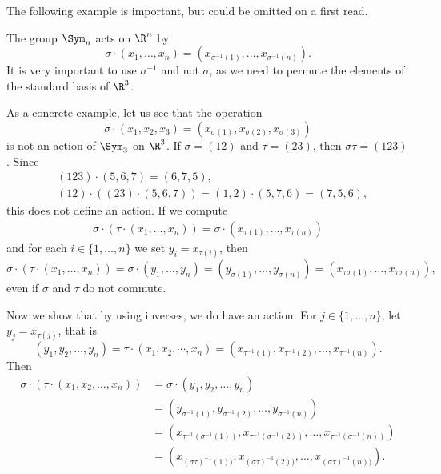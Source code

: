 The following example is important, but could be omitted on a first read.

\begin{optional}  
\begin{example}
    The group $\Sym_n$ acts on $\R^n$ by
    \[
    \sigma\cdot (x_1,\dots,x_n)=(x_{\sigma^{-1}(1)},\dots,x_{\sigma^{-1}(n)}).
    \]
    It is very important to use $\sigma^{-1}$ and not 
    $\sigma$, as we need to permute the elements of the standard basis of $\R^3$.

    As a concrete example, let us see that the operation 
    \[
    \sigma\cdot (x_1,x_2,x_3)=(x_{\sigma(1)},x_{\sigma(2)},x_{\sigma(3)})
    \]
    is not an action of $\Sym_3$ on $\R^3$.
    If $\sigma=(12)$ and $\tau=(23)$, then $\sigma\tau=(123)$. Since 
    \begin{align*}
    &(123)\cdot (5,6,7)=(6,7,5),\\
    &(12)\cdot ((23)\cdot (5,6,7))=(1,2)\cdot (5,7,6)=(7,5,6),
    \end{align*}
    this does not define an action. If we compute 
    \begin{align*}
        \sigma\cdot (\tau\cdot (x_1,\dots,x_n))
        =\sigma\cdot (x_{\tau(1)},\dots,x_{\tau(n)})
    \end{align*}
    and for each $i\in\{1,\dots,n\}$ we set $y_i=x_{\tau(i)}$, then 
    \[
    \sigma\cdot (\tau\cdot (x_1,\dots,x_n))=\sigma\cdot (y_1,\dots,y_n)=(y_{\sigma(1)},\dots,y_{\sigma(n)})
    =(x_{\tau\sigma(1)},\dots,x_{\tau\sigma(n)}),
    \]
    even if $\sigma$ and $\tau$ do not commute.

    Now we show that by using inverses, we do have an action. 
    For $j\in\{1,\dots,n\}$, let $y_j=x_{\tau(j)}$,
    that is 
    \[
    (y_1,y_2,\dots,y_n)=\tau\cdot (x_1,x_2,\cdots,x_n)=(x_{\tau^{-1}(1)},x_{\tau^{-1}(2)},\dots,x_{\tau^{-1}(n)}).
    \]
    Then 
    \begin{align*}
        \sigma\cdot (\tau\cdot (x_1,x_2,\dots,x_n))&=\sigma\cdot (y_1,y_2,\dots,y_n)\\
        &=\left(y_{\sigma^{-1}(1)},y_{\sigma^{-1}(2)},\dots,y_{\sigma^{-1}(n)}\right)\\
        &=\left(x_{\tau^{-1}(\sigma^{-1}(1))},x_{\tau^{-1}(\sigma^{-1}(2))},\dots,x_{\tau^{-1}(\sigma
^{-1}(n))}\right)\\
        &=\left(x_{(\sigma\tau)^{-1}(1))},x_{(\sigma\tau)^{-1}(2))},\dots,x_{(\sigma\tau)^{-1}(n))}\right).
    \end{align*}
\end{example}
\end{optional}

